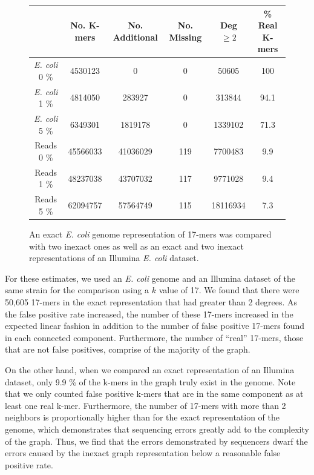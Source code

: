\documentclass[12pt]{article} \usepackage{simplemargins}
\begin{document}
\begin{figure}
\begin{tabular}{ | c || c | c | c | c | c | }
\hline
 & No. K-mers & No. Additional & No. Missing & Deg $\ge 2$ & \% Real K-mers \\ \hline \hline
\emph{E. coli} 0 \% & 4530123 & 0 & 0 & 50605 & 100 \\ \hline
\emph{E. coli} 1 \% & 4814050 & 283927 & 0 & 313844 & 94.1 \\ \hline
\emph{E. coli} 5 \% & 6349301 & 1819178 & 0 & 1339102 & 71.3 \\ \hline
Reads 0 \% & 45566033 & 41036029 & 119 & 7700483 & 9.9 \\ \hline
Reads 1 \% & 48237038 & 43707032 & 117 & 9771028 & 9.4 \\ \hline
Reads 5 \% & 62094757 & 57564749 & 115 & 18116934 & 7.3 \\
\hline
\end{tabular}
\caption{An exact \emph{E. coli} genome representation of 17-mers was compared with 
two inexact ones as well as an exact and two inexact representations of an Illumina 
\emph{E. coli} dataset.}
\end{figure}

For these estimates, we used an \emph{E. coli} genome and an Illumina 
dataset of the same strain for the comparison using a $k$ value of 17. We found 
that there were 50,605 17-mers in the exact representation that had greater than 
2 degrees. As the false positive rate increased, the number of these 
17-mers increased in the expected linear fashion in addition to the number of 
false positive 17-mers found in each connected component. Furthermore, the number of 
``real'' 17-mers, those that are not false positives, 
comprise of the majority of the graph.

On the other hand, when we compared an exact representation of an Illumina dataset, 
only 9.9 \% of the k-mers in the graph truly exist in the genome. Note 
that we only counted false positive k-mers that are in the same component as 
at least one real k-mer. Furthermore, the number of 17-mers with more than 
2 neighbors is proportionally higher than for the exact representation of the 
genome, which demonstrates that sequencing errors greatly add to the complexity 
of the graph. Thus, we find that the errors demonstrated by 
sequencers dwarf the errors caused by the inexact graph representation 
below a reasonable false positive rate.
\end{document}
